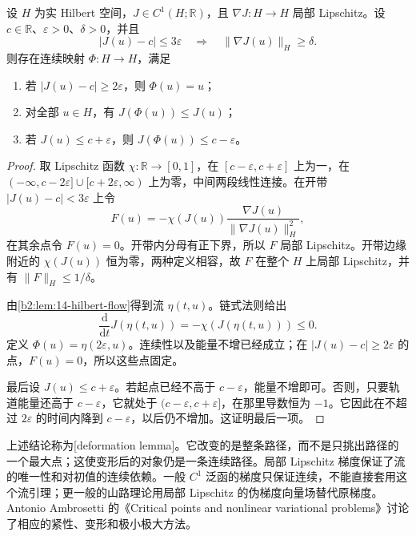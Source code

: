\begin{lemma}[变形引理]\label{b2:lem:14-deformation}
设 \(H\) 为实 Hilbert 空间，\(J\in C^1(H;\mathbb R)\)，且 \(\nabla J:H\to H\) 局部 Lipschitz。设 \(c\in\mathbb R\)、\(\varepsilon>0\)、\(\delta>0\)，并且
\[
 |J(u)-c|\le3\varepsilon
 \quad\Longrightarrow\quad\|\nabla J(u)\|_H\ge\delta.
\]
则存在连续映射 \(\Phi:H\to H\)，满足
\begin{enumerate}
\item\label{b2:item:14-deform-fixed}
若 \(|J(u)-c|\ge2\varepsilon\)，则 \(\Phi(u)=u\)；
\item\label{b2:item:14-deform-decrease}
对全部 \(u\in H\)，有 \(J(\Phi(u))\le J(u)\)；
\item\label{b2:item:14-deform-band}
若 \(J(u)\le c+\varepsilon\)，则 \(J(\Phi(u))\le c-\varepsilon\)。
\end{enumerate}
\end{lemma}
\begin{proof}
取 Lipschitz 函数 \(\chi:\mathbb R\to[0,1]\)，在 \([c-\varepsilon,c+\varepsilon]\) 上为一，在 \(( -\infty,c-2\varepsilon]\cup[c+2\varepsilon,\infty)\) 上为零，中间两段线性连接。在开带 \(|J(u)-c|<3\varepsilon\) 上令
\[
 F(u)=-\chi(J(u))\frac{\nabla J(u)}{\|\nabla J(u)\|_H^2},
\]
在其余点令 \(F(u)=0\)。开带内分母有正下界，所以 \(F\) 局部 Lipschitz。开带边缘附近的 \(\chi(J(u))\) 恒为零，两种定义相容，故 \(F\) 在整个 \(H\) 上局部 Lipschitz，并有 \(\|F\|_H\le1/\delta\)。

由\cref{b2:lem:14-hilbert-flow}得到流 \(\eta(t,u)\)。链式法则给出
\[
 \frac{\mathrm d}{\mathrm dt}J(\eta(t,u))
 =-\chi(J(\eta(t,u)))\le0.
\]
定义 \(\Phi(u)=\eta(2\varepsilon,u)\)。连续性以及能量不增已经成立；在 \(|J(u)-c|\ge2\varepsilon\) 的点，\(F(u)=0\)，所以这些点固定。

最后设 \(J(u)\le c+\varepsilon\)。若起点已经不高于 \(c-\varepsilon\)，能量不增即可。否则，只要轨道能量还高于 \(c-\varepsilon\)，它就处于 \((c-\varepsilon,c+\varepsilon]\)，在那里导数恒为 \(-1\)。它因此在不超过 \(2\varepsilon\) 的时间内降到 \(c-\varepsilon\)，以后仍不增加。这证明最后一项。
\end{proof}

上述结论称为[deformation lemma]。它改变的是整条路径，而不是只挑出路径的一个最大点；这使变形后的对象仍是一条连续路径。局部 Lipschitz 梯度保证了流的唯一性和对初值的连续依赖。一般 \(C^1\) 泛函的梯度只保证连续，不能直接套用这个流引理；更一般的山路理论用局部 Lipschitz 的伪梯度向量场替代原梯度。Antonio Ambrosetti 的《Critical points and nonlinear variational problems》\cite[Sections 2--3]{Ambrosetti1992Critical}讨论了相应的紧性、变形和极小极大方法。

